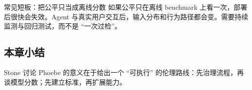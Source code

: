 \begin{warningbox}{常见短板：把公平只当成离线分数}
如果公平只在离线 benchmark 上看一次，部署后很快会失效。Agent 与真实用户交互后，输入分布和行为路径都会变。需要持续监测与回归测试，而不是 ``一次过检''。
\end{warningbox}

\subsection{本章小结}
Stone 讨论 Phoebe 的意义在于给出一个 ``可执行'' 的伦理路线：先治理流程，再谈模型分数；先建立标准，再扩展能力。

